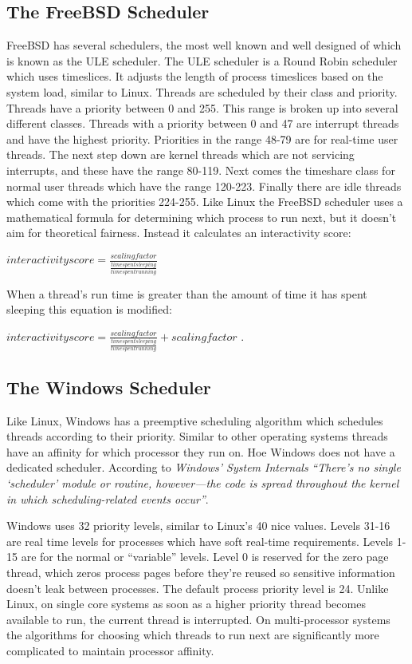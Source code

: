 \documentclass[10pt,conference,draftclsnofoot,onecolumn]{IEEEtran}
\begin{document}
\subsection{The FreeBSD Scheduler}
FreeBSD has several schedulers, the most well known and well designed of which is known as the ULE scheduler. The ULE scheduler is a Round Robin scheduler which uses timeslices. It adjusts the length of process timeslices based on the system load, similar to Linux. Threads are scheduled by their class and priority. Threads have a priority between 0 and 255. This range is broken up into several different classes. Threads with a priority between 0 and 47 are interrupt threads and have the highest priority. Priorities in the range 48-79 are for real-time user threads. The next step down are kernel threads which are not servicing interrupts, and these have the range 80-119. Next comes the timeshare class for normal user threads which have the range 120-223. Finally there are idle threads which come with the priorities 224-255.
Like Linux the FreeBSD scheduler uses a mathematical formula for determining which process to run next, but it doesn't aim for theoretical fairness. Instead it calculates an interactivity score:

$interactivity score = \frac{scaling factor}{\frac{time spent sleeping}{time spent running}}$

When a thread's run time is greater than the amount of time it has spent sleeping this equation is modified:

$interactivity score = \frac{scaling factor}{\frac{time spent sleeping}{time spent running}} + scaling factor$
\cite{3_mckusick_neville-neil_watson_2015}.


\subsection{The Windows Scheduler}
Like Linux, Windows has a preemptive scheduling algorithm which schedules threads according to their priority. Similar to other operating systems threads have an affinity for which processor they run on. Hoe Windows does not have a dedicated scheduler. According to \textit{Windows' System Internals} \textit{``There's no single `scheduler' module or routine, however—the code is spread throughout the kernel in which scheduling-related events occur''}.

Windows uses 32 priority levels, similar to Linux's 40 nice values. Levels 31-16 are real time levels for processes which have soft real-time requirements. Levels 1-15 are for the normal or ``variable'' levels. Level 0 is reserved for the zero page thread, which zeros process pages before they're reused so sensitive information doesn't leak between processes. The default process priority level is 24. Unlike Linux, on single core systems as soon as a higher priority thread becomes available to run, the current thread is interrupted. On multi-processor systems the algorithms for choosing which threads to run next are significantly more complicated to maintain processor affinity.
\end{document}

